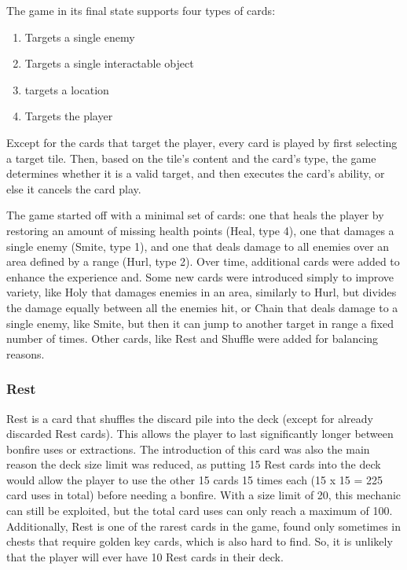 The game in its final state supports four types of cards:

\begin{enumerate}
  \item Targets a single enemy
  \item Targets a single interactable object
  \item targets a location
  \item Targets the player
\end{enumerate}

Except for the cards that target the player, every card is played by first selecting a target tile. Then, based on the tile's content and the card's type, the game determines whether it is a valid target, and then executes the card's ability, or else it cancels the card play.

The game started off with a minimal set of cards: one that heals the player by restoring an amount of missing health points (Heal, type 4), one that damages a single enemy (Smite, type 1), and one that deals damage to all enemies over an area defined by a range (Hurl, type 2). Over time, additional cards were added to enhance the experience and. Some new cards were introduced simply to improve variety, like Holy that damages enemies in an area, similarly to Hurl, but divides the damage equally between all the enemies hit, or Chain that deals damage to a single enemy, like Smite, but then it can jump to another target in range a fixed number of times. Other cards, like Rest and Shuffle were added for balancing reasons.



\subsubsection{Rest}

Rest is a card that shuffles the discard pile into the deck (except for already discarded Rest cards). This allows the player to last significantly longer between bonfire uses or extractions. The introduction of this card was also the main reason the deck size limit was reduced, as putting 15 Rest cards into the deck would allow the player to use the other 15 cards 15 times each (15 x 15 = 225 card uses in total) before needing a bonfire. With a size limit of 20, this mechanic can still be exploited, but the total card uses can only reach a maximum of 100. Additionally, Rest is one of the rarest cards in the game, found only sometimes in chests that require golden key cards, which is also hard to find. So, it is unlikely that the player will ever have 10 Rest cards in their deck.



